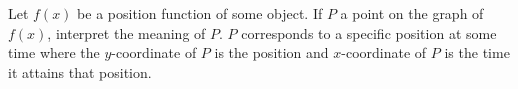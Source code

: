 {Let $f(x)$ be a position function of some object. If $P$ a point on the graph of $f(x)$, interpret the meaning of $P$.}
{$P$ corresponds to a specific position at some time where the $y$-coordinate of $P$ is the position and $x$-coordinate of $P$ is the time it attains that position.}